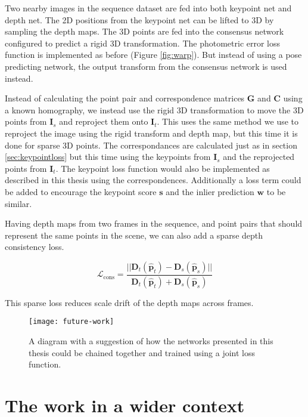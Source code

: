 Two nearby images in the sequence dataset are fed into both keypoint net and depth net. The 2D positions from the keypoint net can be lifted to 3D by sampling the depth maps. The 3D points are fed into the consensus network configured to predict a rigid 3D transformation. The photometric error loss function is implemented as before (Figure \ref{fig:warp}). But instead of using a pose predicting network, the output transform from the consensus network is used instead.

Instead of calculating the point pair and correspondence matrices $\textbf{G}$ and $\textbf{C}$ using a known homography, we instead use the rigid 3D transformation to move the 3D points from $\textbf{I}_s$ and reproject them onto $\textbf{I}_t$. This uses the same method we use to reproject the image using the rigid transform and depth map, but this time it is done for sparse 3D points. The correspondances are calculated just as in section \ref{sec:keypointloss} but this time using the keypoints from $\textbf{I}_s$ and the reprojected points from $\textbf{I}_t$. The keypoint loss function would also be implemented as described in this thesis using the correspondences. Additionally a loss term could be added to encourage the keypoint score $\textbf{s}$ and the inlier prediction $\textbf{w}$ to be similar.

Having depth maps from two frames in the sequence, and point pairs that should represent the same points in the scene, we can also add a sparse depth consistency loss.

\begin{equation}
\mathcal{L}_{\mathrm{cons}}=\frac{
||\textbf{D}_t(\hat{\textbf{p}}_t) - \textbf{D}_s(\hat{\textbf{p}}_s)||
}{
\textbf{D}_t(\hat{\textbf{p}}_t) + \textbf{D}_s(\hat{\textbf{p}}_s)
}
\end{equation}

This sparse loss reduces scale drift of the depth maps across frames.

\begin{figure}[H]
	\centering
	\texttt{[image: future-work]}
	\caption{A diagram with a suggestion of how the networks presented in this thesis could be chained together and trained using a joint loss function.}
	\label{fig:futurework}
\end{figure}

\section{The work in a wider context}

